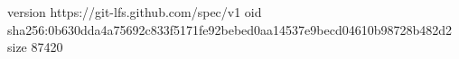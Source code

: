 version https://git-lfs.github.com/spec/v1
oid sha256:0b630dda4a75692c833f5171fe92bebed0aa14537e9becd04610b98728b482d2
size 87420
